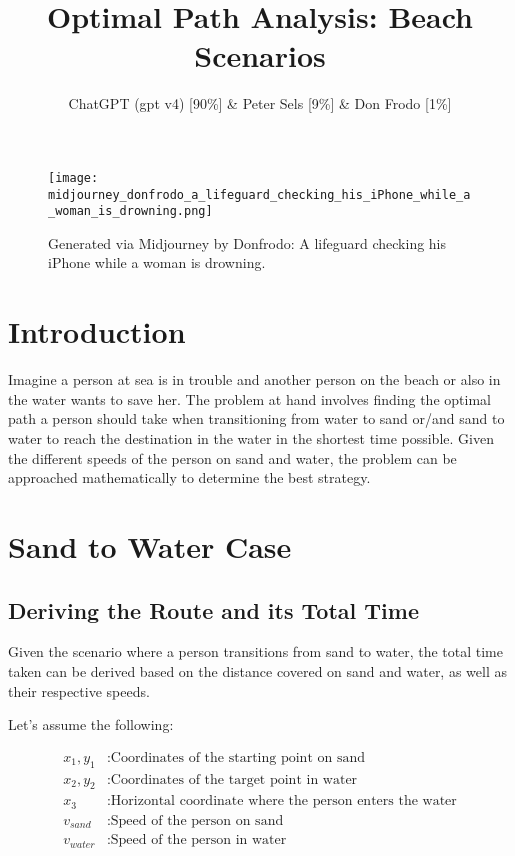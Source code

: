 \documentclass[11pt, a4paper]{article}
\title{Optimal Path Analysis: Beach Scenarios}
\author{ChatGPT (gpt v4) [90\%] \& Peter Sels [9\%] \& Don Frodo [1\%]}
\date{}
\begin{document}
\maketitle


\begin{figure}[h]
\centering
\texttt{[image: midjourney\_donfrodo\_a\_lifeguard\_checking\_his\_iPhone\_while\_a\_woman\_is\_drowning.png]}
\caption{Generated via Midjourney by Donfrodo: A lifeguard checking his iPhone while a woman is drowning.}
\end{figure}


\tableofcontents

\newpage

\section{Introduction}

Imagine a person at sea is in trouble and another person on the beach or also in the water wants to save her.
The problem at hand involves finding the optimal path a person should take when transitioning from water to sand
or/and sand to water to reach the destination in the water in the shortest time possible.
Given the different speeds of the person on sand and water,
the problem can be approached mathematically to determine the best strategy.

\section{Sand to Water Case}

\subsection{Deriving the Route and its Total Time}

Given the scenario where a person transitions from sand to water, the total time taken can be derived based on the
distance covered on sand and water, as well as their respective speeds.

Let's assume the following:

\begin{align*}
x_1, y_1 & : \text{Coordinates of the starting point on sand} \\
x_2, y_2 & : \text{Coordinates of the target point in water} \\
x_3 & : \text{Horizontal coordinate where the person enters the water} \\
v_{sand} & : \text{Speed of the person on sand} \\
v_{water} & : \text{Speed of the person in water}
\end{align*}
\end{document}
